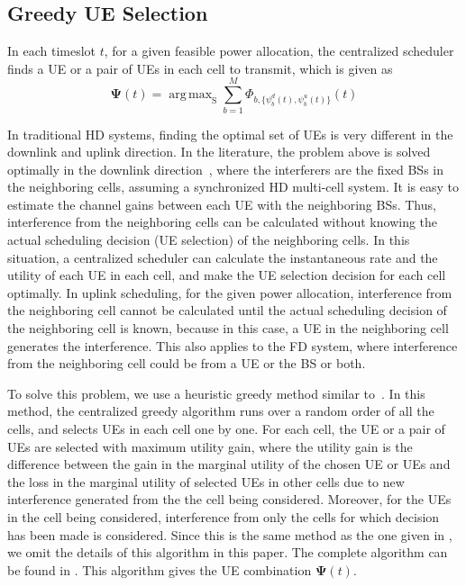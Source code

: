 \documentclass[journal]{IEEEtran}
\DeclareMathOperator*{\argmax}{arg\,max}
\begin{document}
\subsection{Greedy UE Selection }\label{sec:GUS}
In each timeslot $t$, for a given feasible power allocation, the centralized scheduler finds a UE or a pair of UEs in each cell  to transmit, which is given as
\begin{equation}\label{CS1}
 \boldsymbol{\Psi}(t) =\argmax_{\boldsymbol{\mathrm{S}}}  \sum_{b=1}^M \Phi_{b,\{\psi_b^d(t),\psi_b^u(t)\}}(t)   
\end{equation}

In traditional HD systems, finding the optimal set of UEs is very different in the downlink and uplink direction. In the literature, the problem above is solved optimally in the downlink direction~\cite{venturino2009coordinated, yu2010joint, kiani2007maximizing}, where the interferers are the fixed BSs in the neighboring cells, assuming a synchronized HD multi-cell system. It is easy to estimate the channel gains between each UE with the neighboring BSs. Thus, interference from the neighboring cells can be calculated without knowing the actual scheduling decision (UE selection) of the neighboring cells. In this situation, a centralized scheduler can calculate the instantaneous rate and the utility of each UE in each cell, and make the UE selection decision for each cell optimally. In uplink scheduling, for the given power allocation, interference from the neighboring cell cannot be calculated until the actual scheduling decision of the neighboring cell is known, because in this case, a UE in the neighboring cell generates the interference. This also applies to the FD system, where interference from the neighboring cell could be from a UE or the BS or both. 

To solve this problem, we use a heuristic greedy method similar to~\cite{SanjayCISS13,koutsopoulos2006cross}. In this method, the centralized greedy algorithm runs over a random order of all the cells, and selects UEs in each cell one by one. For each cell, the UE or a pair of UEs are selected with maximum utility gain, where the utility gain is the difference between the gain in the marginal utility of the chosen UE or UEs and the loss in the marginal utility of selected UEs in other cells due to new interference generated from the the cell being considered. Moreover, for the UEs in the cell being considered, interference from only the cells for which decision has been made is considered. Since this is the same method as the one given in \cite{SanjayCISS13}, we omit the details of this algorithm in this paper. The complete algorithm can be found in \cite{SanjayCentArxiv}. This algorithm gives the UE combination $\boldsymbol{\Psi}(t)$. 
\end{document}
